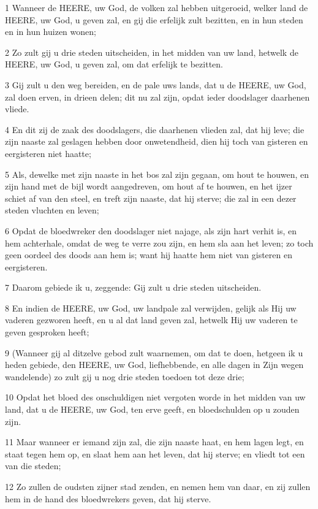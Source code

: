 \par 1 Wanneer de HEERE, uw God, de volken zal hebben uitgeroeid, welker land de HEERE, uw God, u geven zal, en gij die erfelijk zult bezitten, en in hun steden en in hun huizen wonen;
\par 2 Zo zult gij u drie steden uitscheiden, in het midden van uw land, hetwelk de HEERE, uw God, u geven zal, om dat erfelijk te bezitten.
\par 3 Gij zult u den weg bereiden, en de pale uws lands, dat u de HEERE, uw God, zal doen erven, in drieen delen; dit nu zal zijn, opdat ieder doodslager daarhenen vliede.
\par 4 En dit zij de zaak des doodslagers, die daarhenen vlieden zal, dat hij leve; die zijn naaste zal geslagen hebben door onwetendheid, dien hij toch van gisteren en eergisteren niet haatte;
\par 5 Als, dewelke met zijn naaste in het bos zal zijn gegaan, om hout te houwen, en zijn hand met de bijl wordt aangedreven, om hout af te houwen, en het ijzer schiet af van den steel, en treft zijn naaste, dat hij sterve; die zal in een dezer steden vluchten en leven;
\par 6 Opdat de bloedwreker den doodslager niet najage, als zijn hart verhit is, en hem achterhale, omdat de weg te verre zou zijn, en hem sla aan het leven; zo toch geen oordeel des doods aan hem is; want hij haatte hem niet van gisteren en eergisteren.
\par 7 Daarom gebiede ik u, zeggende: Gij zult u drie steden uitscheiden.
\par 8 En indien de HEERE, uw God, uw landpale zal verwijden, gelijk als Hij uw vaderen gezworen heeft, en u al dat land geven zal, hetwelk Hij uw vaderen te geven gesproken heeft;
\par 9 (Wanneer gij al ditzelve gebod zult waarnemen, om dat te doen, hetgeen ik u heden gebiede, den HEERE, uw God, liefhebbende, en alle dagen in Zijn wegen wandelende) zo zult gij u nog drie steden toedoen tot deze drie;
\par 10 Opdat het bloed des onschuldigen niet vergoten worde in het midden van uw land, dat u de HEERE, uw God, ten erve geeft, en bloedschulden op u zouden zijn.
\par 11 Maar wanneer er iemand zijn zal, die zijn naaste haat, en hem lagen legt, en staat tegen hem op, en slaat hem aan het leven, dat hij sterve; en vliedt tot een van die steden;
\par 12 Zo zullen de oudsten zijner stad zenden, en nemen hem van daar, en zij zullen hem in de hand des bloedwrekers geven, dat hij sterve.
